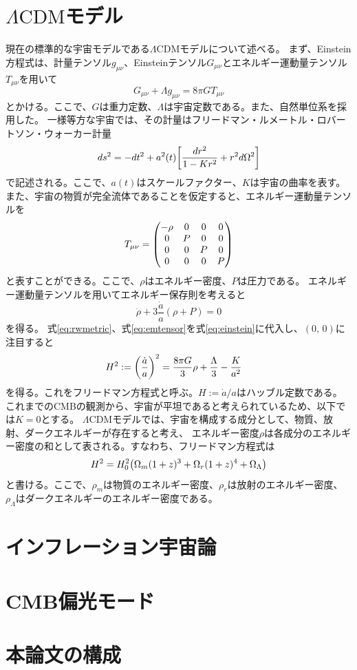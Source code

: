 \documentclass[../../main.tex]{subfiles}
\begin{document}
\section{$\Lambda\mathrm{CDM}$モデル}
現在の標準的な宇宙モデルである$\Lambda\mathrm{CDM}$モデルについて述べる。
まず、Einstein方程式は、計量テンソル$g_{\mu\nu}$、Einsteinテンソル$G_{\mu\nu}$とエネルギー運動量テンソル$T_{\mu\nu}$を用いて
\begin{equation}
    \label{eq:einstein}
    G_{\mu\nu}+\Lambda g_{\mu\nu}=8\pi GT_{\mu\nu}
\end{equation}
とかける。ここで、$G$は重力定数、$\Lambda$は宇宙定数である。また、自然単位系を採用した。
一様等方な宇宙では、その計量はフリードマン・ルメートル・ロバートソン・ウォーカー計量
\begin{equation}
    \label{eq:rwmetric}
    ds^2=-dt^2+a^2(t)\qty[\frac{dr^2}{1-Kr^2}+r^2d\Omega^2]
\end{equation}
で記述される。ここで、$a(t)$はスケールファクター、$K$は宇宙の曲率を表す。
また、宇宙の物質が完全流体であることを仮定すると、エネルギー運動量テンソルを
\begin{equation}
    \label{eq:emtensor}
    T_{\mu\nu}=\mqty(-\rho&0&0&0\\0&P&0&0\\0&0&P&0\\0&0&0&P)
\end{equation}
と表すことができる。ここで、$\rho$はエネルギー密度、$P$は圧力である。
エネルギー運動量テンソルを用いてエネルギー保存則を考えると
\begin{equation}
    \label{eq:energyconservation}
    \dot{\rho}+3\dfrac{\dot{a}}{a}(\rho+P)=0
\end{equation}
を得る。
式\eqref{eq:rwmetric}、式\eqref{eq:emtensor}を式\eqref{eq:einstein}に代入し、$(0,\,0)$に注目すると
\begin{align}
    \label{eq:friedmann}
    H^2:=\qty(\dfrac{\dot{a}}{a})^2 &= \dfrac{8\pi G}{3}\rho+\dfrac{\Lambda}{3}-\dfrac{K}{a^2}
\end{align}
を得る。これをフリードマン方程式と呼ぶ。$H:=\dot{a}/a$はハッブル定数である。
これまでのCMBの観測から、宇宙が平坦であると考えられている\cite{Bennett_2003}ため、以下では$K=0$とする。
$\Lambda\mathrm{CDM}$モデルでは、宇宙を構成する成分として、物質、放射、ダークエネルギーが存在すると考え、
エネルギー密度$\rho$は各成分のエネルギー密度の和として表される。すなわち、フリードマン方程式は
\begin{equation}
    \label{eq:friedmann2}
    H^2=H_0^2\qty(\Omega_m(1+z)^3+\Omega_r(1+z)^4+\Omega_{\Lambda})
\end{equation}
と書ける。ここで、$\rho_m$は物質のエネルギー密度、$\rho_r$は放射のエネルギー密度、$\rho_{\Lambda}$はダークエネルギーのエネルギー密度である。

\section{インフレーション宇宙論}

\section{CMB偏光モード}
\section{本論文の構成}
\end{document}
